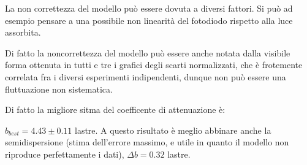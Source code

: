 \documentclass[a4paper,10pt]{article}
\begin{document}
La non correttezza del modello può essere dovuta a diversi fattori. Si può ad esempio pensare a una possibile non linearità del fotodiodo rispetto alla luce assorbita. 

Di fatto la noncorrettezza del modello può essere anche notata dalla visibile forma ottenuta in tutti e tre i grafici degli scarti normalizzati, che è frotemente correlata fra i diversi esperimenti indipendenti, dunque non può essere una fluttuazione non sistematica.

Di fatto la migliore sitma del coefficente di attenuazione è:

$b_{best}=4.43 \pm 0.11$ lastre.%
A questo risultato è meglio abbinare anche la semidispersione (stima dell'errore massimo, e utile in quanto il modello non riproduce perfettamente i dati), $\Delta b=0.32$ lastre. 
\end{document}

